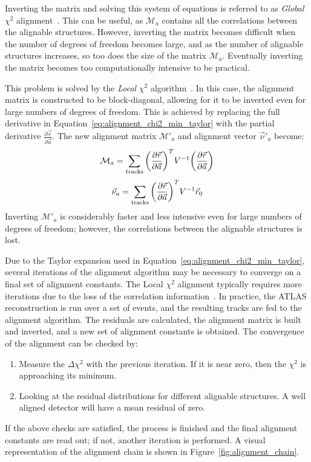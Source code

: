 Inverting the matrix and solving this system of equations is referred to as \emph{Global} $\chi^2$ alignment~\cite{2005.global-chi2-alignment}.
This can be useful, as $\mathcal{M}_a$ contains all the correlations between the alignable structures.
However, inverting the matrix becomes difficult when the number of degrees of freedom becomes large, and
as the number of alignable structures increases, so too does the size of the matrix $\mathcal{M}_a$.
Eventually inverting the matrix becomes too computationally intensive to be practical.

This problem is solved by the \emph{Local} $\chi^2$ algorithm~\cite{2005.local-chi2-thesis}.
In this case, the alignment matrix is constructed to be block-diagonal, allowing for it to be inverted even for large numbers of degrees of freedom.
This is achieved by replacing the full derivative in Equation~\ref{eq:alignment_chi2_min_taylor} with the partial derivative $\frac{\partial\vec{r}}{\partial\vec{a}}$.
The new alignment matrix $\mathcal{M}'_{a}$ and alignment vector $\vec{\nu}'_a$ become:
\begin{equation}
  \mathcal{M}_a = \sum\limits_{\textrm{tracks}}\bigg(\pderiv{\vec{r}}{\vec{a}}\bigg)^{T}V^{-1}\bigg(\pderiv{\vec{r}}{\vec{a}}\bigg)
  \label{eq:alignment_matrix_local}
\end{equation}
\begin{equation}
  \vec{\nu}_a = \sum\limits_{\textrm{tracks}}\bigg(\pderiv{\vec{r}}{\vec{a}}\bigg)^{T}V^{-1}\vec{r}_0
  \label{eq:alignment_vector_local}
\end{equation}
Inverting $\mathcal{M}'_{a}$ is considerably faster and less intensive even for large numbers of degrees of freedom; however, the correlations between the alignable structures is lost.

Due to the Taylor expansion used in Equation~\ref{eq:alignment_chi2_min_taylor}, several iterations of the alignment algorithm may be necessary to converge on a final set of alignment constants.
The Local $\chi^2$ alignment typically requires more iterations due to the loss of the correlation information~\cite{2007.alignment-strategy}.
In practice, the ATLAS reconstruction is run over a set of events, and the resulting tracks are fed to the alignment algorithm.
The residuals are calculated, the alignment matrix is built and inverted, and a new set of alignment constants is obtained.
The convergence of the alignment can be checked by:
\begin{enumerate}
\item Measure the $\Delta\chi^2$ with the previous iteration. If it is near zero, then the $\chi^2$ is approaching its minimum.
\item Looking at the residual distributions for different alignable structures. A well aligned detector will have a mean residual of zero.
\end{enumerate}
If the above checks are satisfied, the process is finished and the final alignment constants are read out; if not, another iteration is performed.
A visual representation of the alignment chain is shown in Figure~\ref{fig:alignment_chain}.

